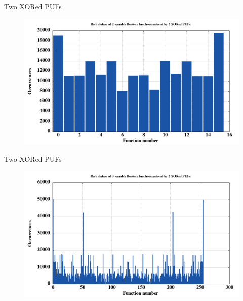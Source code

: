 \documentclass[10pt, compress]{beamer}
\begin{document}
\begin{frame}{Two XORed PUFs}
    \begin{figure}
        \centering
        \includegraphics[width=\textwidth]{figures/dist/distribution_of_2-variable_boolean_functions_induced_by_2_xored_pufs.png}
    \end{figure}
\end{frame}

\begin{frame}{Two XORed PUFs}
    \begin{figure}
        \centering
        \includegraphics[width=\textwidth]{figures/dist/distribution_of_3-variable_boolean_functions_induced_by_2_xored_pufs.png}
    \end{figure}
\end{frame}
\end{document}
